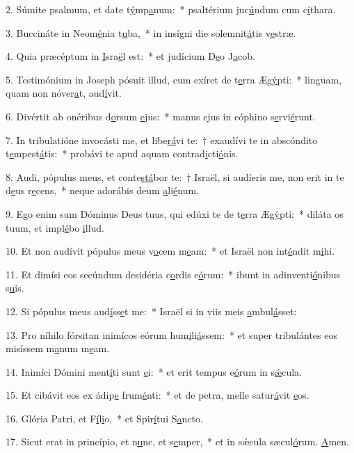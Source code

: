 2. Súmite psalmum, et date t\uline{ý}mp\uline{a}num:~* psaltérium juc\uline{ú}ndum cum c\uline{í}thara.\par 
3. Buccináte in Neom\uline{é}nia t\uline{u}ba,~* in insígni die solemnit\uline{á}tis v\uline{e}stræ.\par 
4. Quia præcéptum in \uline{I}sra\uline{ë}l est:~* et judícium D\uline{e}o J\uline{a}cob.\par 
5. Testimónium in Joseph pósuit illud, cum exíret de t\uline{e}rra Æg\uline{ý}pti:~* linguam, quam non nóver\uline{a}t, aud\uline{í}vit.\par 
6. Divértit ab onéribus d\uline{o}rsum \uline{e}jus:~* manus ejus in cóphino s\uline{e}rvi\uline{é}runt.\par 
7. In tribulatióne invocásti me, et libe\uline{rá}vi te:~† exaudívi te in abscóndito t\uline{e}mpest\uline{á}tis:~* probávi te apud aquam contrad\uline{i}cti\uline{ó}nis.\par 
8. Audi, pópulus meus, et conte\uline{stá}bor te:~† Israël, si audíeris me, non erit in te d\uline{e}us r\uline{e}cens,~* neque adorábis deum \uline{a}li\uline{é}num.\par 
9. Ego enim sum Dóminus Deus tuus, qui edúxi te de t\uline{e}rra Æg\uline{ý}pti:~* diláta os tuum, et impl\uline{é}bo \uline{i}llud.\par 
10. Et non audívit pópulus meus v\uline{o}cem m\uline{e}am:~* et Israël non int\uline{é}ndit m\uline{i}hi.\par 
11. Et dimísi eos secúndum desidéria c\uline{o}rdis e\uline{ó}rum:~* ibunt in adinventi\uline{ó}nibus s\uline{u}is.\par 
12. Si pópulus meus aud\uline{í}ss\uline{e}t me:~* Israël si in viis meis \uline{a}mbul\uline{á}sset:\par 
13. Pro níhilo fórsitan inimícos eórum hum\uline{i}li\uline{á}ssem:~* et super tribulántes eos misíssem m\uline{a}num m\uline{e}am.\par 
14. Inimíci Dómini ment\uline{í}ti sunt \uline{e}i:~* et erit tempus e\uline{ó}rum in s\uline{ǽ}cula.\par 
15. Et cibávit eos ex ádip\uline{e} frum\uline{é}nti:~* et de petra, melle satur\uline{á}vit \uline{e}os.\par 
16. Glória Patri, et F\uline{í}l\uline{i}o,~* et Spir\uline{í}tui S\uline{a}ncto.\par 
17. Sicut erat in princípio, et n\uline{u}nc, et s\uline{e}mper,~* et in sǽcula sæcul\uline{ó}rum. \uline{A}men.\par 
